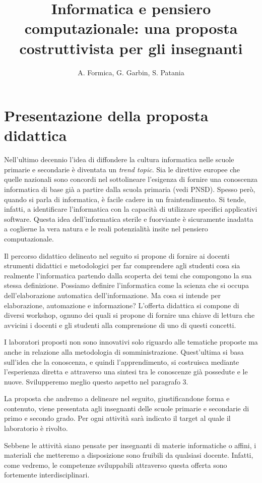 \documentclass[12pt]{article}
\title{Informatica e pensiero computazionale: una proposta costruttivista per gli insegnanti}
\author{A. Formica, G. Garbin, S. Patania}
\begin{document}
\maketitle
%
% 
\section{Presentazione della proposta didattica}
Nell’ultimo decennio l’idea di diffondere la cultura informatica nelle scuole primarie e secondarie è diventata un \emph{trend topic}. Sia le direttive europee che quelle nazionali sono concordi nel sottolineare l’esigenza di fornire una conoscenza informatica di base già a partire dalla scuola primaria (vedi PNSD). Spesso però, quando si parla di informatica, è facile cadere in un fraintendimento. Si tende, infatti, a identificare l’informatica con la capacità di utilizzare specifici applicativi software. Questa idea dell’informatica sterile e fuorviante è sicuramente inadatta a coglierne la vera natura e le reali potenzialità insite nel pensiero computazionale.

Il percorso didattico delineato nel seguito si propone di fornire ai docenti strumenti didattici e metodologici per far comprendere agli studenti cosa sia realmente l’informatica partendo dalla scoperta dei temi che compongono la sua stessa definizione. Possiamo definire l’informatica come la scienza che si occupa dell’elaborazione automatica dell’informazione. Ma cosa si intende per elaborazione, automazione e informazione? L’offerta didattica si compone di diversi workshop, ognuno dei quali si propone di fornire una chiave di lettura che avvicini i docenti e gli studenti alla comprensione di uno di questi concetti.

I laboratori proposti non sono innovativi solo riguardo alle tematiche proposte ma anche in relazione alla metodologia di somministrazione. Quest’ultima si basa sull’idea che la conoscenza, e quindi l’apprendimento, si costruisca mediante l’esperienza diretta e attraverso una sintesi tra le conoscenze già possedute e le nuove. Svilupperemo meglio questo aspetto nel paragrafo 3.

La proposta che andremo a delineare nel seguito, giustificandone forma e contenuto, viene presentata agli insegnanti delle scuole primarie e secondarie di primo e secondo grado. Per ogni attività sarà indicato il target al quale il laboratorio è rivolto.

Sebbene le attività siano pensate per insegnanti di materie informatiche o affini, i materiali che metteremo a disposizione sono fruibili da qualsiasi docente. Infatti, come vedremo, le competenze sviluppabili attraverso questa offerta sono fortemente interdisciplinari.
%
%
\end{document}
